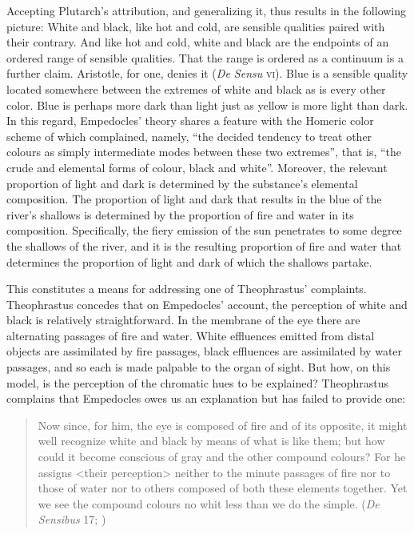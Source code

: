 Accepting Plutarch's attribution, and generalizing it, thus results in the following picture: White and black, like hot and cold, are sensible qualities paired with their contrary. And like hot and cold, white and black are the endpoints of an ordered range of sensible qualities. That the range is ordered as a continuum is a further claim. Aristotle, for one, denies it (\emph{De Sensu} \textsc{vi}). Blue is a sensible quality located somewhere between the extremes of white and black as is every other color. Blue is perhaps more dark than light just as yellow is more light than dark. In this regard, Empedocles' theory shares a feature with the Homeric color scheme of which \citet[458]{Gladstone:1858fk} complained, namely, ``the decided tendency to treat other colours as simply intermediate modes between these two extremes'', that is, ``the crude and elemental forms of colour, black and white''. Moreover, the relevant proportion of light and dark is determined by the substance's elemental composition. The proportion of light and dark that results in the blue of the river's shallows is determined by the proportion of fire and water in its composition. Specifically, the fiery emission of the sun penetrates to some degree the shallows of the river, and it is the resulting proportion of fire and water that determines the proportion of light and dark of which the shallows partake. 

This constitutes a means for addressing one of Theophrastus' complaints. Theo\-phrastus concedes that on Empedocles' account, the perception of white and black is relatively straightforward. In the membrane of the eye there are alternating passages of fire and water. White effluences emitted from distal objects are assimilated by fire passages, black effluences are assimilated by water passages, and so each is made palpable to the organ of sight. But how, on this model, is the perception of the chromatic hues to be explained? Theophrastus complains that Empedocles owes us an explanation but has failed to provide one:
\begin{quote}
	Now since, for him, the eye is composed of fire and of its opposite, it might well recognize white and black by means of what is like them; but how could it become conscious of gray and the other compound colours? For he assigns <their perception> neither to the minute passages of fire nor to those of water nor to others composed of both these elements together. Yet we see the compound colours no whit less than we do the simple. (\emph{De Sensibus} 17; \citealt{Stratton:1917vn})
\end{quote}

